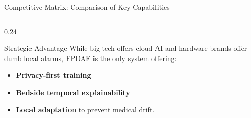 \documentclass[aspectratio=169, 11pt]{beamer}
\begin{document}
\begin{frame}{Competitive Matrix: Comparison of Key Capabilities}
\begin{columns}[c]
        \begin{column}{0.24\textwidth}
            \begin{block}{\textcolor{neonCyan}{Strategic Advantage}}
                \scriptsize
                While big tech offers cloud AI and hardware brands offer dumb local alarms, FPDAF is the only system offering:
                \begin{itemize}
                    \item \textbf{Privacy-first training}
                    \item \textbf{Bedside temporal explainability}
                    \item \textbf{Local adaptation} to prevent medical drift.
                \end{itemize}
            \end{block}
        \end{column}
    \end{columns}
\end{frame}
\end{document}
